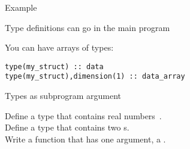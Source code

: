 \begin{block}{Example}
  \label{sl:ftype-ex}
  \begin{multicols}{2}
    \columnbreak
  \end{multicols}
  Type definitions can go in the main program
\end{block}

You can have arrays of types:
\begin{verbatim}
type(my_struct) :: data
type(my_struct),dimension(1) :: data_array
\end{verbatim}

\begin{block}{Types as subprogram argument}
  \label{sl:ftype-pass}
  \begin{multicols}{2}
    \columnbreak
  \end{multicols}

\end{block}

\begin{exercise}
  \label{ex:ftype-rect}
  Define a type  that contains real numbers~.\\
  Define a type  that contains two s.\\
  Write a function  that has one argument, a .
\end{exercise}
